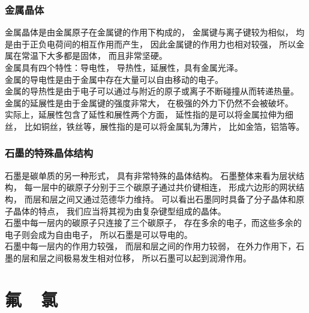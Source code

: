 \documentclass[UTF8]{ctexart}
\begin{document}
\newpage

\subsubsection{金属晶体}
    金属晶体是由金属原子在金属键的作用下构成的，
    金属键与离子键较为相似，
    均是由于正负电荷间的相互作用而产生，
    因此金属键的作用力也相对较强，
    所以金属在常温下大多都是固体，
    而且非常坚硬。\\[3mm]
    金属具有四个特性：导电性，
    导热性，延展性，具有金属光泽。\\[3mm]
    金属的导电性是由于金属中存在大量可以自由移动的电子。\\[3mm]
    金属的导热性是由于电子可以通过与附近的原子或离子不断碰撞从而转递热量。\\[3mm]
    金属的延展性是由于金属键的强度非常大，
    在极强的外力下仍然不会被破坏。\\[3mm]
    实际上，延展性包含了延性和展性两个方面，
    延性指的是可以将金属拉伸为细丝，
    比如铜丝，铁丝等，展性指的是可以将金属轧为薄片，
    比如金箔，铝箔等。

\subsubsection{石墨的特殊晶体结构}
    石墨是碳单质的另一种形式，
    具有非常特殊的晶体结构。
    石墨整体来看为层状结构，
    每一层中的碳原子分别于三个碳原子通过共价键相连，
    形成六边形的网状结构，
    而层和层之间又通过范德华力维持。
    可以看出石墨同时具备了分子晶体和原子晶体的特点，
    我们应当将其视为由复杂键型组成的晶体。\\[3mm]
    石墨中每一层内的碳原子只连接了三个碳原子，
    存在多余的电子，而这些多余的电子则会成为自由电子，
    所以石墨是可以导电的。\\[3mm]
    石墨中每一层内的作用力较强，
    而层和层之间的作用力较弱，
    在外力作用下，石墨的层和层之间极易发生相对位移，
    所以石墨可以起到润滑作用。

\newpage

\section{氟~~氯}
\end{document}

